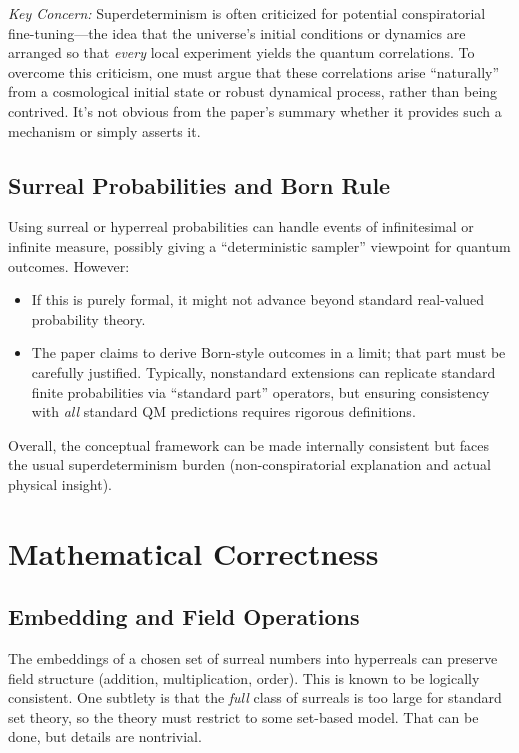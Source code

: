 \documentclass[11pt]{article}
\begin{document}
\emph{Key Concern:} Superdeterminism is often criticized for potential conspiratorial fine-tuning---the idea that the universe's initial conditions or dynamics are arranged so that \emph{every} local experiment yields the quantum correlations. To overcome this criticism, one must argue that these correlations arise ``naturally'' from a cosmological initial state or robust dynamical process, rather than being contrived. It's not obvious from the paper's summary whether it provides such a mechanism or simply asserts it.

\subsection{Surreal Probabilities and Born Rule}
Using surreal or hyperreal probabilities can handle events of infinitesimal or infinite measure, possibly giving a ``deterministic sampler'' viewpoint for quantum outcomes. However:

\begin{itemize}
  \item If this is purely formal, it might not advance beyond standard real-valued probability theory.
  \item The paper claims to derive Born-style outcomes in a limit; that part must be carefully justified. Typically, nonstandard extensions can replicate standard finite probabilities via ``standard part'' operators, but ensuring consistency with \emph{all} standard QM predictions requires rigorous definitions.
\end{itemize}

\noindent Overall, the conceptual framework can be made internally consistent but faces the usual superdeterminism burden (non-conspiratorial explanation and actual physical insight).

\section{Mathematical Correctness}

\subsection{Embedding and Field Operations}
The embeddings of a chosen set of surreal numbers into hyperreals can preserve field structure (addition, multiplication, order). This is known to be logically consistent. One subtlety is that the \emph{full} class of surreals is too large for standard set theory, so the theory must restrict to some set-based model. That can be done, but details are nontrivial.
\end{document}
